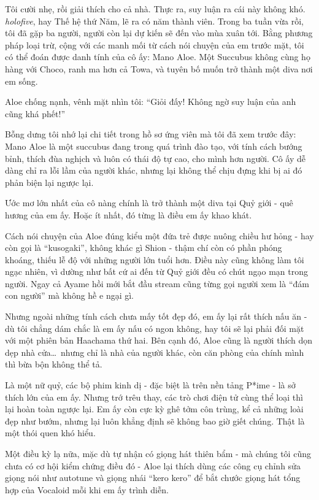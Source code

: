 \documentclass[../main.tex]{subfiles}
\begin{document}
Tôi cười nhẹ, rồi giải thích cho cả nhà. Thực ra, suy luận ra cái này không khó. \textit{holofive}, hay Thế hệ thứ Năm, lẽ ra có năm thành viên. Trong ba tuần vừa rồi, tôi đã gặp ba người, người còn lại dự kiến sẽ đến vào mùa xuân tới. Bằng phương pháp loại trừ, cộng với các manh mối từ cách nói chuyện của em trước mặt, tôi có thể đoán được danh tính của cô ấy: Mano Aloe. Một Succubus không cùng họ hàng với Choco, ranh ma hơn cả Towa, và tuyên bố muốn trở thành một diva nơi em sống.

Aloe chống nạnh, vênh mặt nhìn tôi: ``Giỏi đấy! Không ngờ suy luận của anh cũng khá phết!''

\chrint


Bỗng dưng tôi nhớ lại chi tiết trong hồ sơ ứng viên mà tôi đã xem trước đây: Mano Aloe là một succubus đang trong quá trình đào tạo, với tính cách bướng bỉnh, thích đùa nghịch và luôn có thái độ tự cao, cho mình hơn người. Cô ấy dễ dàng chỉ ra lỗi lầm của người khác, nhưng lại không thể chịu đựng khi bị ai đó phản biện lại ngược lại.

Ước mơ lớn nhất của cô nàng chính là trở thành một diva tại Quỷ giới - quê hương của em ấy. Hoặc ít nhất, đó từng là điều em ấy khao khát.

Cách nói chuyện của Aloe đúng kiểu một đứa trẻ được nuông chiều hư hỏng - hay còn gọi là ``kusogaki'', không khác gì Shion - thậm chí còn có phần phóng khoáng, thiếu lễ độ với những người lớn tuổi hơn. Điều này cũng không làm tôi ngạc nhiên, vì dường như bất cứ ai đến từ Quỷ giới đều có chút ngạo mạn trong người. Ngay cả Ayame hồi mới bắt đầu stream cũng từng gọi người xem là ``đám con người'' mà không hề e ngại gì.

Nhưng ngoài những tính cách chưa mấy tốt đẹp đó, em ấy lại rất thích nấu ăn - dù tôi chẳng dám chắc là em ấy nấu có ngon không, hay tôi sẽ lại phải đối mặt với một phiên bản Haachama thứ hai. Bên cạnh đó, Aloe cũng là người thích dọn dẹp nhà cửa\dots\ nhưng chỉ là nhà của người khác, còn căn phòng của chính mình thì bừa bộn không thể tả.

Là một nữ quỷ, các bộ phim kinh dị - đặc biệt là trên nền tảng P*ime - là sở thích lớn của em ấy. Nhưng trớ trêu thay, các trò chơi điện tử cùng thể loại thì lại hoàn toàn ngược lại. Em ấy còn cực kỳ ghê tởm côn trùng, kể cả những loài đẹp như bướm, nhưng lại luôn khẳng định sẽ không bao giờ giết chúng. Thật là một thói quen khó hiểu.

Một điều kỳ lạ nữa, mặc dù tự nhận có giọng hát thiên bẩm - mà chúng tôi cũng chưa có cơ hội kiểm chứng điều đó - Aloe lại thích dùng các công cụ chỉnh sửa giọng nói như autotune và giọng nhái ``kero kero'' để bắt chước giọng hát tổng hợp của Vocaloid mỗi khi em ấy trình diễn.
\end{document}
